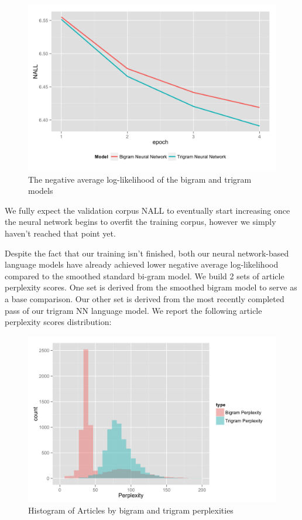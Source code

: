 \documentclass[fleqn,12pt]{SelfArx} %
\begin{document}
\begin{figure}[ht]
\includegraphics[width=\linewidth]{nall.png}
\caption{The negative average log-likelihood of the bigram and trigram models}
\label{fig:perp_hist}
\end{figure}
 
We fully expect the validation corpus NALL to eventually start increasing once the neural network begins to overfit the training corpus, however we simply haven't reached that point yet. 
 
Despite the fact that our training isn't finished, both our neural network-based language models have already achieved lower negative average log-likelihood compared to the smoothed standard bi-gram model. We build 2 sets of article perplexity scores. One set is derived from the smoothed bigram model to serve as a base comparison. Our other set is derived from the most recently completed pass of our trigram NN language model. We report the following article perplexity scores distribution:


\begin{figure}[ht]
\includegraphics[width=\linewidth]{perplexity.png}
\caption{Histogram of Articles by bigram and trigram perplexities}
\label{fig:perp_hist}
\end{figure}
\end{document}
